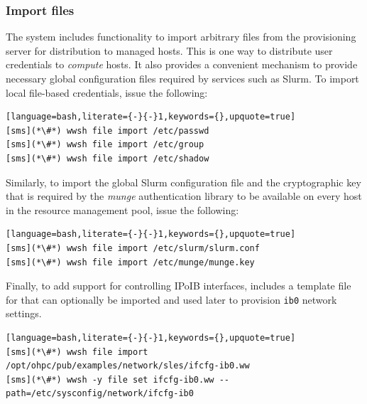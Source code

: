 \documentclass[letterpaper]{article}
\begin{document}
\subsubsection{Import files} \label{sec:file_import}

The \Warewulf{} system includes functionality to import arbitrary files from
the provisioning server for distribution to managed hosts. This is one way to
distribute user credentials to {\em compute} hosts. It also provides a
convenient mechanism to provide necessary global configuration files required
by services such as Slurm. To import local file-based credentials, issue the
following:

\begin{lstlisting}[language=bash,literate={-}{-}1,keywords={},upquote=true]
[sms](*\#*) wwsh file import /etc/passwd
[sms](*\#*) wwsh file import /etc/group
[sms](*\#*) wwsh file import /etc/shadow 
\end{lstlisting}

Similarly, to import the global Slurm configuration file and the cryptographic
key that is required by the {\em munge} authentication library to be available
on every host in the resource management pool, issue the following:

\begin{lstlisting}[language=bash,literate={-}{-}1,keywords={},upquote=true]
[sms](*\#*) wwsh file import /etc/slurm/slurm.conf
[sms](*\#*) wwsh file import /etc/munge/munge.key
\end{lstlisting}

Finally, to add support for controlling IPoIB interfaces, \OHPC{} includes a
template file for \Warewulf{} that can optionally be imported and used later to provision
\texttt{ib0} network settings.

\begin{lstlisting}[language=bash,literate={-}{-}1,keywords={},upquote=true]
[sms](*\#*) wwsh file import /opt/ohpc/pub/examples/network/sles/ifcfg-ib0.ww
[sms](*\#*) wwsh -y file set ifcfg-ib0.ww --path=/etc/sysconfig/network/ifcfg-ib0
\end{lstlisting}



\end{document}
